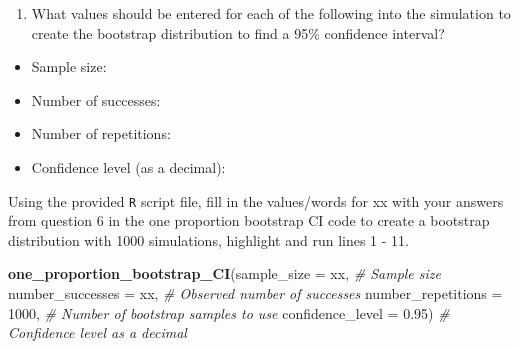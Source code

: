 \documentclass[
]{report}
\newenvironment{Shaded}{\begin{snugshade}}{\end{snugshade}}
\newcommand{\CommentTok}[1]{\textcolor[rgb]{0.56,0.35,0.01}{\textit{#1}}}
\newcommand{\DataTypeTok}[1]{\textcolor[rgb]{0.13,0.29,0.53}{#1}}
\newcommand{\DecValTok}[1]{\textcolor[rgb]{0.00,0.00,0.81}{#1}}
\newcommand{\FloatTok}[1]{\textcolor[rgb]{0.00,0.00,0.81}{#1}}
\newcommand{\KeywordTok}[1]{\textcolor[rgb]{0.13,0.29,0.53}{\textbf{#1}}}
\newcommand{\NormalTok}[1]{#1}
\providecommand{\tightlist}{%
  \setlength{\itemsep}{0pt}\setlength{\parskip}{0pt}}
\begin{document}
\begin{enumerate}
\def\labelenumi{\arabic{enumi}.}
\setcounter{enumi}{5}
\tightlist
\item
  What values should be entered for each of the following into the simulation to create the bootstrap distribution to find a 95\% confidence interval?
  \vspace{1mm}
\end{enumerate}

\begin{itemize}
\tightlist
\item
  Sample size:
\end{itemize}

\vspace{.1in}

\begin{itemize}
\tightlist
\item
  Number of successes:
\end{itemize}

\vspace{.1in}

\begin{itemize}
\tightlist
\item
  Number of repetitions:
\end{itemize}

\vspace{.1in}

\begin{itemize}
\tightlist
\item
  Confidence level (as a decimal):
\end{itemize}

\vspace{.1in}

Using the provided \texttt{R} script file, fill in the values/words for xx with your answers from question 6 in the one proportion bootstrap CI code to create a bootstrap distribution with 1000 simulations, highlight and run lines 1 - 11.

\begin{Shaded}
\begin{Highlighting}[]
\KeywordTok{one\_proportion\_bootstrap\_CI}\NormalTok{(}\DataTypeTok{sample\_size =}\NormalTok{ xx, }\CommentTok{\# Sample size}
                    \DataTypeTok{number\_successes =}\NormalTok{ xx, }\CommentTok{\# Observed number of successes}
                    \DataTypeTok{number\_repetitions =} \DecValTok{1000}\NormalTok{, }\CommentTok{\# Number of bootstrap samples to use}
                    \DataTypeTok{confidence\_level =} \FloatTok{0.95}\NormalTok{) }\CommentTok{\# Confidence level as a decimal}
\end{Highlighting}
\end{Shaded}
\end{document}
